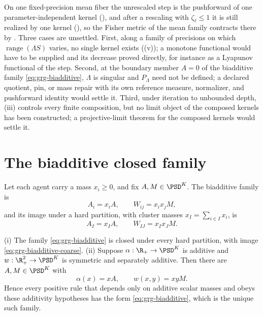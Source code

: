 On one fixed-precision mean fiber the unrescaled step is the pushforward of one
parameter-independent kernel (), and after a
rescaling with \(\zeta_\ell\leq1\) it is still realized by one kernel
(), so the Fisher metric of the mean family contracts
there by . Three cases are unsettled. First, along a
family of precisions on which \(\operatorname{range}(\Lambda S)\) varies, no single kernel
exists ((v)); a monotone functional would have to be
supplied and its decrease proved directly, for instance as a Lyapunov functional of the
step. Second, at the boundary member \(A=0\) of the biadditive family
\eqref{eq:grg-biadditive}, \(\Lambda\) is singular and \(P_\Lambda\) need not be defined; a
declared quotient, pin, or mass repair with its own reference measure, normalizer, and
pushforward identity would settle it. Third, under iteration to unbounded depth,
(iii) controls every finite composition, but no limit
object of the composed kernels has been constructed; a projective-limit theorem for the
composed kernels would settle it.

\section{The biadditive closed family}
\label{sec:grg-biadditive}

Let each agent carry a mass \(x_i\geq0\), and fix \(A,M\in\PSD^K\). The biadditive family
is
\begin{equation}
A_i=x_iA,
\qquad
W_{ij}=x_ix_jM,
\label{eq:grg-biadditive}
\end{equation}
and its image under a hard partition, with cluster masses \(x_I=\sum_{i\in I}x_i\), is
\begin{equation}
A_I=x_IA,
\qquad
W_{IJ}=x_Ix_JM.
\label{eq:grg-biadditive-coarse}
\end{equation}

(i) The family \eqref{eq:grg-biadditive} is closed under every hard partition, with
image \eqref{eq:grg-biadditive-coarse}.
(ii) Suppose \(\alpha:\R_+\to\PSD^K\) is additive and \(w:\R_+^2\to\PSD^K\) is symmetric
and separately additive. Then there are \(A,M\in\PSD^K\) with
\begin{equation}
\alpha(x)=xA,
\qquad
w(x,y)=xyM.
\label{eq:grg-additive-classification}
\end{equation}
Hence every positive rule that depends only on additive scalar masses and obeys these
additivity hypotheses has the form \eqref{eq:grg-biadditive}, which is the unique such
family. 

